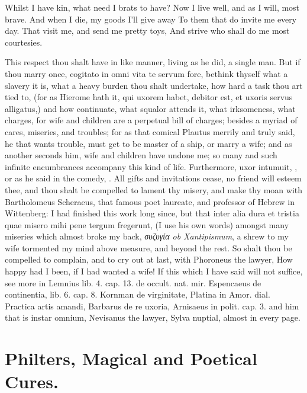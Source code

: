 {Whilst I have kin, what need I brats to have?
Now I live well, and as I will, most brave.
And when I die, my goods I'll give away
To them that do invite me every day.
That visit me, and send me pretty toys,
And strive who shall do me most courtesies.

This respect thou shalt have in like manner, living as he did, a single
man. But if thou marry once, cogitato in omni vita te servum
fore, bethink thyself what a slavery it is, what a heavy burden thou
shalt undertake, how hard a task thou art tied to, (for as Hierome hath
it, qui uxorem habet, debitor est, et uxoris servus alligatus,) and how
continuate, what squalor attends it, what irksomeness, what charges,
for wife and children are a perpetual bill of charges; besides a myriad
of cares, miseries, and troubles; for as that comical Plautus merrily
and truly said, he that wants trouble, must get to be master of a ship,
or marry a wife; and as another seconds him, wife and children have
undone me; so many and such infinite encumbrances accompany this kind
of life. Furthermore, uxor intumuit, \etc{}, or as he said in the comedy,
. All
gifts and invitations cease, no friend will esteem thee, and thou shalt
be compelled to lament thy misery, and make thy moan with
Bartholomeus Scheraeus, that famous poet laureate, and professor
of Hebrew in Wittenberg: I had finished this work long since, but that
inter alia dura et tristia quae misero mihi pene tergum fregerunt, (I
use his own words) amongst many miseries which almost broke my back,
\emph{συζυγία ob Xantipismum}, a shrew to my wife tormented my mind above
measure, and beyond the rest. So shalt thou be compelled to complain,
and to cry out at last, with Phoroneus the lawyer, How happy had
I been, if I had wanted a wife! If this which I have said will not
suffice, see more in Lemnius lib. 4. cap. 13. de occult. nat. mir.
Espencaeus de continentia, lib. 6. cap. 8. Kornman de virginitate,
Platina in Amor. dial. Practica artis amandi, Barbarus de re uxoria,
Arnisaeus in polit. cap. 3. and him that is instar omnium, Nevisanus
the lawyer, Sylva nuptial, almost in every page.

\section{Philters, Magical and Poetical Cures.}

}
